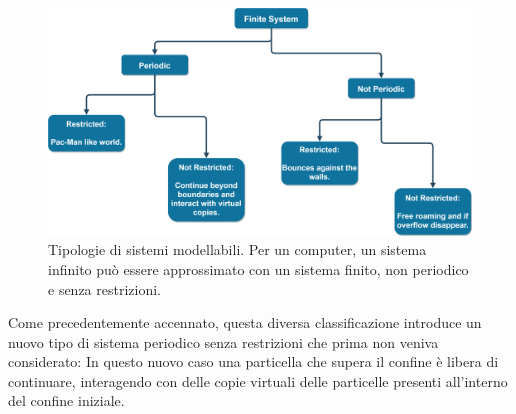 \documentclass[11pt, a4paper]{article}
\begin{document}
\begin{figure}[ht]
\centering
\includegraphics[width=\textwidth]{images/Treediag.png}
\caption{Tipologie di sistemi modellabili. Per un computer, un sistema infinito può essere approssimato con un sistema finito, non periodico e senza restrizioni.}
\label{treesys}
\end{figure}

Come precedentemente accennato, questa diversa classificazione introduce un nuovo tipo di sistema periodico senza restrizioni che prima non veniva considerato: In questo nuovo caso una particella che supera il confine è libera di continuare, interagendo con delle copie virtuali delle particelle presenti all'interno del confine iniziale.
\end{document}
